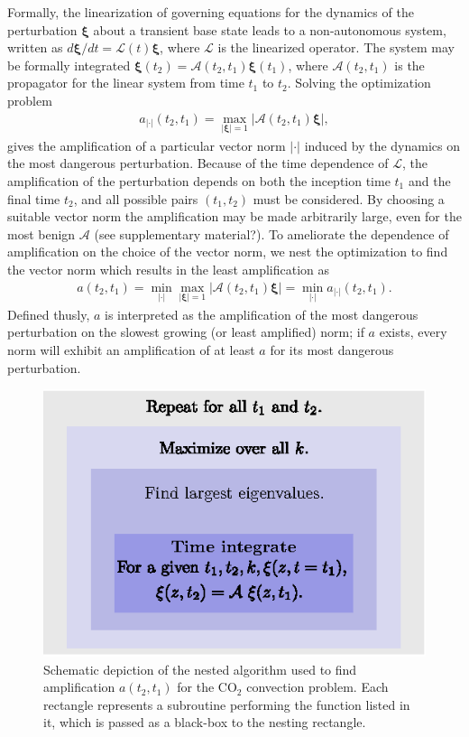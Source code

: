 \documentclass[letterpaper,10pt,prl,twocolumn,aps,reprint,superscriptaddress]{revtex4-1}
\newcommand{\cotwo}{CO$_2$ }
\newcommand{\cL}{\boldsymbol{\mathcal{L}}}
\newcommand{\cA}{\boldsymbol{\mathcal{A}}}
\newcommand{\prt}{\boldsymbol{\xi}}
\newcommand{\nrm}{{|\cdot|}}
\begin{document}
Formally, the linearization of governing equations for the dynamics of the perturbation $\prt$ about a transient base state leads to a non-autonomous system, written as ${d\prt}/{dt} = \cL(t)\prt$, where $\cL$ is the linearized operator. 
The system may be formally integrated $\prt (t_2) = \cA(t_2, t_1) \prt (t_1)$, where $\cA (t_2, t_1)$ is the propagator for the linear system from time $t_1$ to $t_2$. Solving the optimization problem 
\begin{align}
a_\nrm(t_2, t_1) = \max_{|\prt|=1} {| \cA(t_2, t_1) \prt|}, \label{eqn:amp1}
\end{align}
gives the amplification of a particular vector norm $|\cdot|$ induced by the dynamics on the most dangerous perturbation. 
Because of the time dependence of $\cL$, the amplification of the perturbation depends on both the inception time $t_1$ and the final time $t_2$, and all possible pairs $(t_1, t_2)$ must be considered. 
By choosing a suitable vector norm the amplification may be made arbitrarily large, even for the most benign $\cA$ (see supplementary material?). 
To ameliorate the dependence of amplification on the choice of the vector norm, we nest the optimization to find the vector norm which results in the least amplification as
\begin{align}
a(t_2, t_1) = \min_{|\cdot|} \max_{|\prt|=1} {| \cA(t_2, t_1) \prt|} = \min_{|\cdot|} a_\nrm (t_2, t_1). \label{eqn:amp2}
\end{align}
Defined thusly, $a$ is interpreted as the amplification of the most dangerous perturbation on the slowest growing (or least amplified) norm; 
if $a$ exists, every norm will exhibit an amplification of at least $a$ for its most dangerous perturbation.
\begin{figure}
 \centering
 \includegraphics{./Figures/Algorithm}
 \caption{Schematic depiction of the nested algorithm used to find amplification $a(t_2, t_1)$ for the \cotwo convection problem. Each rectangle represents a subroutine performing the function listed in it, which is passed as a black-box to the nesting rectangle.}
 \label{fig:Algorithm}
\end{figure}
\end{document}
